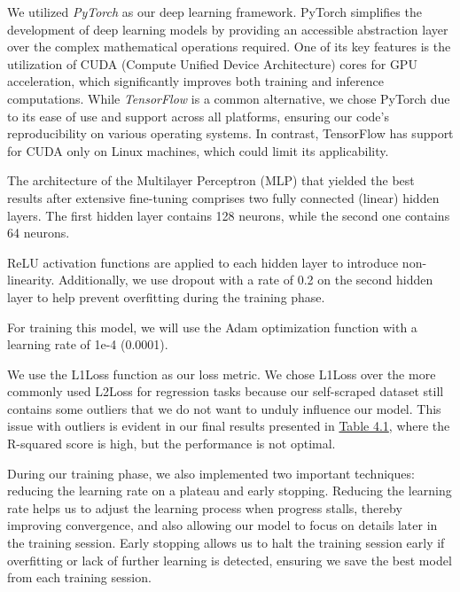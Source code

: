 We utilized \textit{PyTorch} \cite{pytorch} as our deep learning framework. PyTorch simplifies the development of deep learning models by providing an accessible abstraction layer over the complex mathematical operations required. One of its key features is the utilization of CUDA (Compute Unified Device Architecture) cores for GPU acceleration, which significantly improves both training and inference computations. While \textit{TensorFlow} \cite{tensorflow} is a common alternative, we chose PyTorch due to its ease of use and support across all platforms, ensuring our code's reproducibility on various operating systems. In contrast, TensorFlow has support for CUDA only on Linux machines, which could limit its applicability.

The architecture of the Multilayer Perceptron (MLP) that yielded the best results after extensive fine-tuning comprises two fully connected (linear) hidden layers. The first hidden layer contains 128 neurons, while the second one contains 64 neurons.

ReLU activation functions are applied to each hidden layer to introduce non-linearity. Additionally, we use dropout with a rate of 0.2 on the second hidden layer to help prevent overfitting during the training phase.

For training this model, we will use the Adam optimization function with a learning rate of 1e-4 (0.0001). 

We use the L1Loss function as our loss metric. We chose L1Loss over the more commonly used L2Loss for regression tasks because our self-scraped dataset still contains some outliers that we do not want to unduly influence our model. This issue with outliers is evident in our final results presented in \hyperref[tab:best-results]{Table 4.1}, where the R-squared score is high, but the performance is not optimal.

During our training phase, we also implemented two important techniques: reducing the learning rate on a plateau and early stopping. Reducing the learning rate helps us to adjust the learning process when progress stalls, thereby improving convergence, and also allowing our model to focus on details later in the training session. Early stopping allows us to halt the training session early if overfitting or lack of further learning is detected, ensuring we save the best model from each training session.

